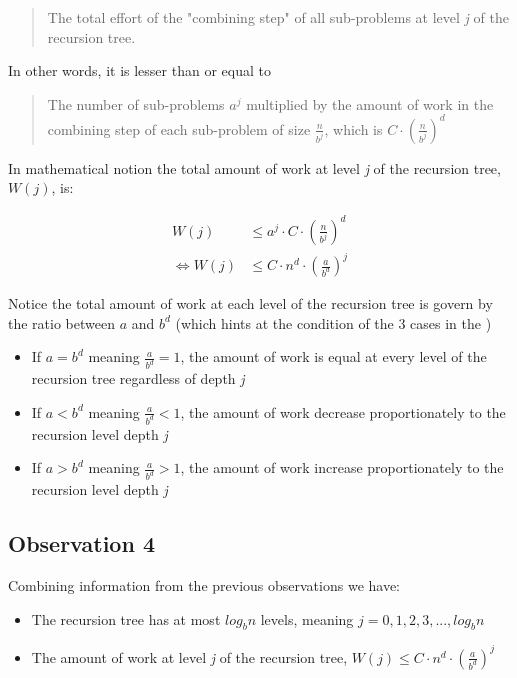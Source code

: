 \documentclass{article}
\begin{document}
\begin{quote}
The total effort of the "combining step" of all sub-problems at level \textit{j} of the recursion tree.
\end{quote}

\noindent In other words, it is lesser than or equal to

\begin{quote}
The number of sub-problems $a^j$ multiplied by the amount of work in the combining step of each sub-problem of size $\frac{n}{b^j}$, which is $C \cdot (\frac{n}{b^j})^d$
\end{quote}

\noindent In mathematical notion the total amount of work at level \textit{j} of the recursion tree, $W(j)$, is:

\begin{equation*}
\begin{split}
W(j) & \leq a^j \cdot C \cdot (\frac{n}{b^j})^d \\
\iff W(j) & \leq C \cdot n^d \cdot (\frac{a}{b^d})^j
\end{split}
\end{equation*}

\noindent Notice the total amount of work at each level of the recursion tree is govern by the ratio between $a$ and $b^d$ (which hints at the condition of the 3 cases in the )

\begin{itemize}[label={}]
    \item If $a = b^d$ meaning $\frac{a}{b^d} = 1$, the amount of work is equal at every level of the recursion tree regardless of depth \textit{j}
    \item If $a < b^d$ meaning $\frac{a}{b^d} < 1$, the amount of work decrease proportionately to the recursion level depth \textit{j}
    \item If $a > b^d$ meaning $\frac{a}{b^d} > 1$, the amount of work increase proportionately to the recursion level depth \textit{j}
\end{itemize}

\subsection*{Observation 4}

\noindent Combining information from the previous observations we have:

\begin{itemize}[label={}]
    \item The recursion tree has at most $log_{b} n$ levels, meaning $j = 0, 1, 2, 3, ..., log_{b} n$
    \item The amount of work at level \textit{j} of the recursion tree, $W(j) \leq C \cdot n^d \cdot (\frac{a}{b^d})^j$
\end{itemize}
\end{document}
